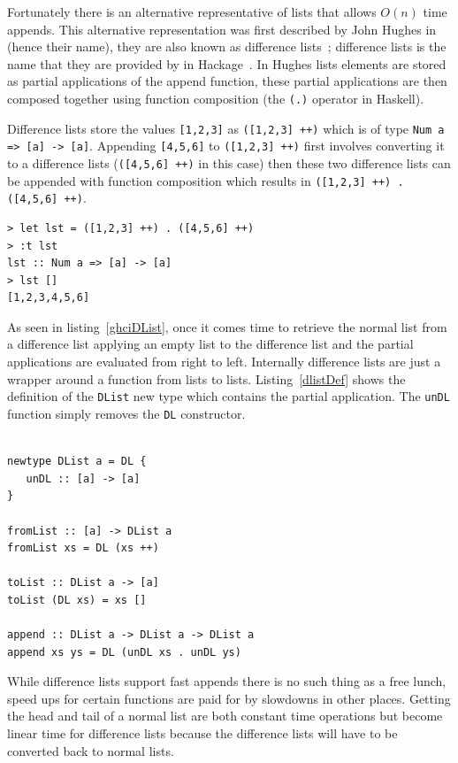 Fortunately there is an alternative representative of lists that allows $O(n)$ time appends. This alternative representation was first described by John Hughes in~\citep{hughesList} (hence their name), they are also known as difference lists~\citep{realWorldHaskell}; difference lists is the name that they are provided by in Hackage~\citep{dlist}. In Hughes lists elements are stored as partial applications of the append function, these partial applications are then composed together using function composition (the \texttt{(.)} operator in Haskell). 

Difference lists store the values \texttt{[1,2,3]} as \texttt{([1,2,3] ++)} which is of type \texttt{Num a => [a] -> [a]}. Appending \texttt{[4,5,6]} to \texttt{([1,2,3] ++)} first involves converting it to a difference lists (\texttt{([4,5,6] ++)} in this case) then these two difference lists can be appended with function composition which results in \texttt{([1,2,3] ++) . ([4,5,6] ++)}. 

\begin{lstlisting}[caption={Building and deconstructing difference lists.},label=ghciDList]
> let lst = ([1,2,3] ++) . ([4,5,6] ++)
> :t lst
lst :: Num a => [a] -> [a]
> lst []
[1,2,3,4,5,6]
\end{lstlisting}

As seen in listing~\ref{ghciDList}, once it comes time to retrieve the normal list from a difference list applying an empty list to the difference list and the partial applications are evaluated from right to left. Internally difference lists are just a wrapper around a function from lists to lists. Listing~\ref{dlistDef} shows the definition of the \texttt{DList} new type which contains the partial application. The \texttt{unDL} function simply removes the \texttt{DL} constructor. 

\begin{lstlisting}[caption={The definition of \texttt{DList} taken from~\citep{realWorldHaskell}}, label=dlistDef]

newtype DList a = DL {
   unDL :: [a] -> [a]
}

fromList :: [a] -> DList a
fromList xs = DL (xs ++)

toList :: DList a -> [a]
toList (DL xs) = xs []

append :: DList a -> DList a -> DList a
append xs ys = DL (unDL xs . unDL ys)
\end{lstlisting}

While difference lists support fast appends there is no such thing as a free lunch, speed ups for certain functions are paid for by slowdowns in other places. Getting the head and tail of a normal list are both constant time operations but become linear time for difference lists because the difference lists will have to be converted back to normal lists. 


